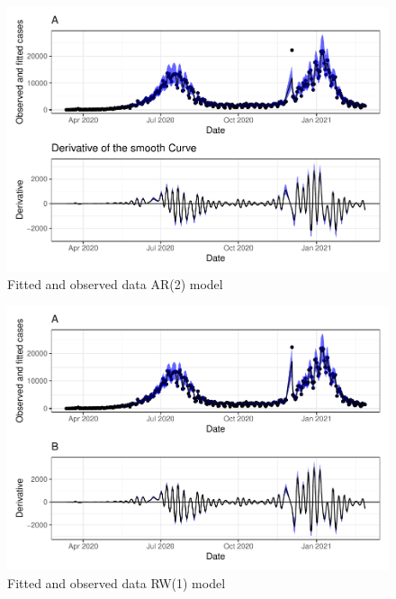 \documentclass[10pt,letterpaper]{article}
\begin{document}
\begin{figure}[H]
\includegraphics[width=0.99\linewidth]{COVIDincidenceSA_files/figure-latex/unnamed-chunk-13-1} \caption{Fitted and observed data AR(2) model}\label{fig:unnamed-chunk-13}
\end{figure}

\begin{figure}[H]
\includegraphics[width=0.99\linewidth]{COVIDincidenceSA_files/figure-latex/unnamed-chunk-14-1} \caption{Fitted and observed data RW(1) model}\label{fig:unnamed-chunk-14}
\end{figure}
\end{document}
